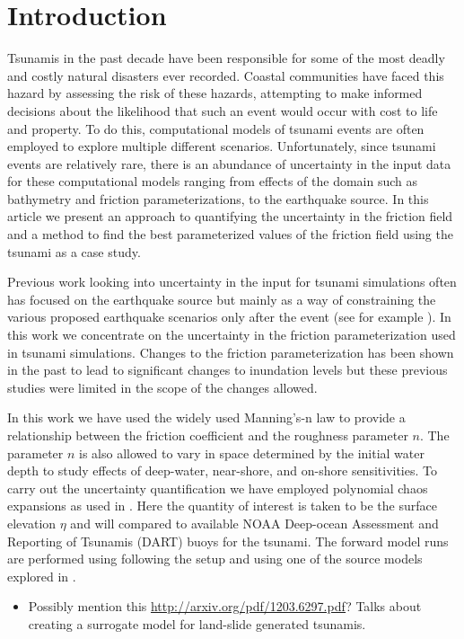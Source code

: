 
\section{Introduction}

Tsunamis in the past decade have been responsible for some of the most deadly and costly natural disasters ever recorded.  Coastal communities have faced this hazard by assessing the risk of these hazards, attempting to make informed decisions about the likelihood that such an event would occur with cost to life and property.  To do this, computational models of tsunami events are often employed to explore multiple different scenarios.  Unfortunately, since tsunami events are relatively rare, there is an abundance of uncertainty in the input data for these computational models ranging from effects of the domain such as bathymetry and friction parameterizations, to the earthquake source.  In this article we present an approach to quantifying the uncertainty in the friction field and a method to find the best parameterized values of the friction field using the \tohoku tsunami as a case study.

Previous work looking into uncertainty in the input for tsunami simulations often has focused on the earthquake source but mainly as a way of constraining the various proposed earthquake scenarios only after the event (see for example \cite{MacInnes:2013cr}).  In this work we concentrate on the uncertainty in the friction parameterization used in tsunami simulations.  Changes to the friction parameterization has been shown in the past to lead to significant changes to inundation levels \cite{Myers:2001el,Jakeman:2010hk} but these previous studies were limited in the scope of the changes allowed.  

In this work we have used the widely used Manning's-n law to provide a relationship between the friction coefficient and the roughness parameter $n$.  The parameter $n$ is also allowed to vary in space determined by the initial water depth to study effects of deep-water, near-shore, and on-shore sensitivities.  To carry out the uncertainty quantification we have employed polynomial chaos expansions as used in \cite{sraj:2013a,sraj:2013b}.  Here the quantity of interest is taken to be the surface elevation $\eta$ and will compared to available NOAA Deep-ocean Assessment and Reporting of Tsunamis (DART) buoys for the \tohoku tsunami.  The forward model runs are performed using \geoclaw following the setup and using one of the source models explored in \cite{MacInnes:2013cr}.

\begin{itemize}
    \item Possibly mention this \url{http://arxiv.org/pdf/1203.6297.pdf}?  Talks about creating a surrogate model for land-slide generated tsunamis.
\end{itemize}


